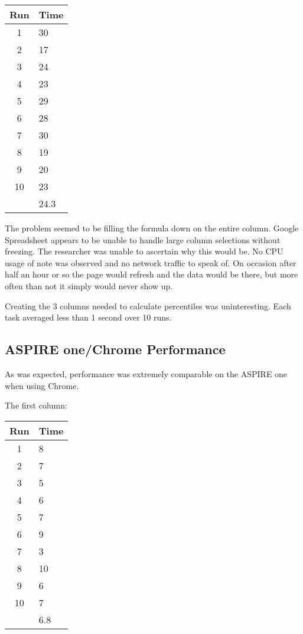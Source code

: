 \documentclass[12pt,oneside,letterpaper,titlepage]{article}
\begin{document}
\begin{tabular}{| c | l |}
  \hline
  Run  & Time \\ \hline
  1    & 30   \\ \hline
  2    & 17   \\ \hline
  3    & 24   \\ \hline
  4    & 23   \\ \hline
  5    & 29   \\ \hline
  6    & 28   \\ \hline
  7    & 30   \\ \hline
  8    & 19   \\ \hline
  9    & 20   \\ \hline
  10   & 23   \\ \hline
       & 24.3 \\
  \hline
\end{tabular}

The problem seemed to be filling the formula down on the entire column.  Google
Spreadsheet appears to be unable to handle large column selections without
freezing.  The researcher was unable to ascertain why this would be.  No CPU
usage of note was observed and no network traffic to speak of.  On occasion
after half an hour or so the page would refresh and the data would be there, but
more often than not it simply would never show up.

Creating the 3 columns needed to calculate percentiles was uninteresting.  Each
task averaged less than 1 second over 10 runs.

\subsection{ASPIRE one/Chrome Performance}

As was expected, performance was extremely comparable on the ASPIRE one when
using Chrome.

The first column:

\begin{tabular}{| c | l |}
  \hline
  Run  & Time \\ \hline
  1    & 8    \\ \hline
  2    & 7    \\ \hline
  3    & 5    \\ \hline
  4    & 6    \\ \hline
  5    & 7    \\ \hline
  6    & 9    \\ \hline
  7    & 3    \\ \hline
  8    & 10   \\ \hline
  9    & 6    \\ \hline
  10   & 7    \\ \hline
       & 6.8  \\
  \hline
\end{tabular}
\end{document}
